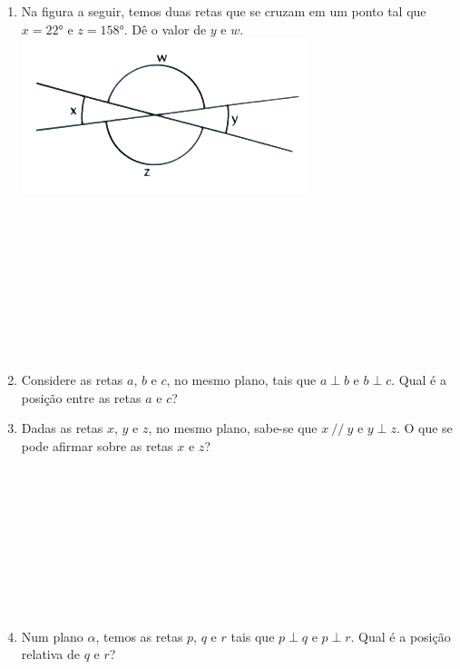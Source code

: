 \documentclass[a4paper,14pt]{article}
\begin{document}
    	\begin{multicols}{2}
    	\begin{enumerate}
   			\item Na figura a seguir, temos duas retas que se cruzam em um ponto tal que $x = 22°$ e $z = 158°$. Dê o valor de $y$ e $w$.
   			\includegraphics[width=1\linewidth]{6FMA69_imagens/imagem4} \\\\\\\\\\\\\\\\\\\\
   			\item Considere as retas $a$, $b$ e $c$, no mesmo plano, tais que $a \perp b$ e $b \perp c$. Qual é a posição entre as retas $a$ e $c$? \newpage
   			\item Dadas as retas $x$, $y$ e $z$, no mesmo plano, sabe-se que $x~//~y$ e $y \perp z$. O que se pode afirmar sobre as retas $x$ e $z$? \\\\\\\\\\\\\\\\\\\\
   			\item Num plano $\alpha$, temos as retas $p$, $q$ e $r$ tais que $p \perp q$ e $p \perp r$. Qual é a posição relativa de $q$ e $r$?\\\\\\\\\\\\\\\\\\\\

\end{enumerate}
\end{multicols}
\end{document}
